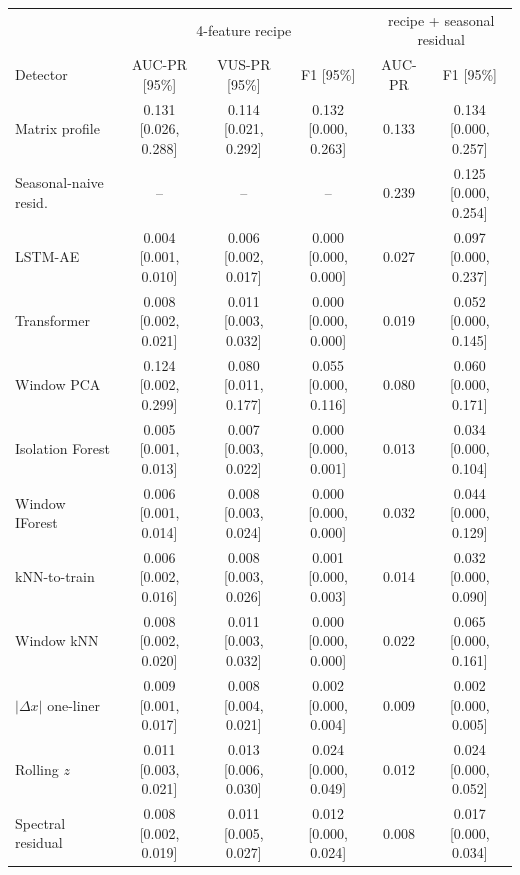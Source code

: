\begin{tabular}{lccccc}
\toprule
 & \multicolumn{3}{c}{4-feature recipe} & \multicolumn{2}{c}{recipe + seasonal residual} \\
Detector & AUC-PR [95\%] & VUS-PR [95\%] & F1 [95\%] & AUC-PR & F1 [95\%] \\
\midrule
Matrix profile & 0.131 [0.026, 0.288] & 0.114 [0.021, 0.292] & 0.132 [0.000, 0.263] & 0.133 & 0.134 [0.000, 0.257] \\
Seasonal-naive resid. & -- & -- & -- & 0.239 & 0.125 [0.000, 0.254] \\
LSTM-AE & 0.004 [0.001, 0.010] & 0.006 [0.002, 0.017] & 0.000 [0.000, 0.000] & 0.027 & 0.097 [0.000, 0.237] \\
Transformer & 0.008 [0.002, 0.021] & 0.011 [0.003, 0.032] & 0.000 [0.000, 0.000] & 0.019 & 0.052 [0.000, 0.145] \\
Window PCA & 0.124 [0.002, 0.299] & 0.080 [0.011, 0.177] & 0.055 [0.000, 0.116] & 0.080 & 0.060 [0.000, 0.171] \\
Isolation Forest & 0.005 [0.001, 0.013] & 0.007 [0.003, 0.022] & 0.000 [0.000, 0.001] & 0.013 & 0.034 [0.000, 0.104] \\
Window IForest & 0.006 [0.001, 0.014] & 0.008 [0.003, 0.024] & 0.000 [0.000, 0.000] & 0.032 & 0.044 [0.000, 0.129] \\
kNN-to-train & 0.006 [0.002, 0.016] & 0.008 [0.003, 0.026] & 0.001 [0.000, 0.003] & 0.014 & 0.032 [0.000, 0.090] \\
Window kNN & 0.008 [0.002, 0.020] & 0.011 [0.003, 0.032] & 0.000 [0.000, 0.000] & 0.022 & 0.065 [0.000, 0.161] \\
$|\Delta x|$ one-liner & 0.009 [0.001, 0.017] & 0.008 [0.004, 0.021] & 0.002 [0.000, 0.004] & 0.009 & 0.002 [0.000, 0.005] \\
Rolling $z$ & 0.011 [0.003, 0.021] & 0.013 [0.006, 0.030] & 0.024 [0.000, 0.049] & 0.012 & 0.024 [0.000, 0.052] \\
Spectral residual & 0.008 [0.002, 0.019] & 0.011 [0.005, 0.027] & 0.012 [0.000, 0.024] & 0.008 & 0.017 [0.000, 0.034] \\
\bottomrule
\end{tabular}
